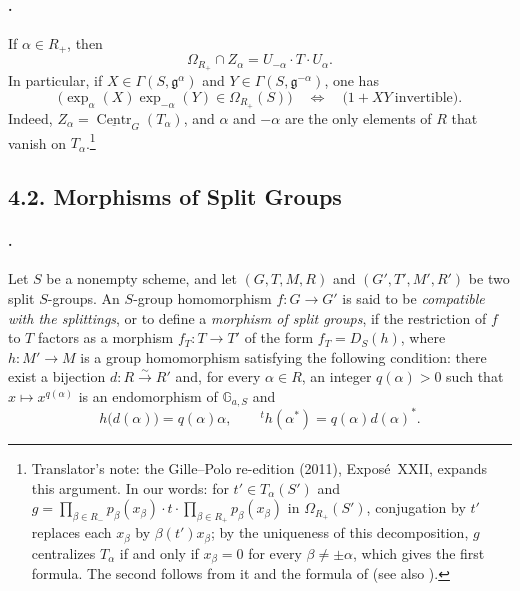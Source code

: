 \paragraph{.}
If \(\alpha\in R_+\), then
\[
  \Omega_{R_+}\cap Z_\alpha
  =
  U_{-\alpha}\mathbin{\cdot}T\mathbin{\cdot}U_\alpha.
\]
In particular, if \(X\in\Gamma(S,\mathfrak g^\alpha)\) and
\(Y\in\Gamma(S,\mathfrak g^{-\alpha})\), one has
\[
  \bigl(\exp_\alpha(X)\exp_{-\alpha}(Y)\in\Omega_{R_+}(S)\bigr)
  \quad\Longleftrightarrow\quad
  \bigl(1+XY\ \text{invertible}\bigr).
\]
Indeed, \(Z_\alpha=\underline{\operatorname{Centr}}_G(T_\alpha)\), and
\(\alpha\) and \(-\alpha\) are the only elements of \(R\) that vanish
on \(T_\alpha\).\footnote{Translator's note: the Gille--Polo re-edition (2011), Exposé~XXII, expands
this argument. In our words: for \(t'\in T_\alpha(S')\) and
\(g=\prod_{\beta\in R_-}p_\beta(x_\beta)\cdot t\cdot\prod_{\beta\in R_+}p_\beta(x_\beta)\)
in \(\Omega_{R_+}(S')\), conjugation by \(t'\) replaces each \(x_\beta\) by
\(\beta(t')x_\beta\); by the uniqueness of this decomposition, \(g\)
centralizes \(T_\alpha\) if and only if \(x_\beta=0\) for every
\(\beta\ne\pm\alpha\), which gives the first formula. The second follows from
it and the formula of  (see also ).}

\subsection*{4.2. Morphisms of Split Groups}

\paragraph{.}
Let \(S\) be a nonempty scheme, and let
\((G,T,M,R)\) and \((G',T',M',R')\) be two split \(S\)-groups.
An \(S\)-group homomorphism \(f:G\to G'\) is said to be
\emph{compatible with the splittings}, or to define a
\emph{morphism of split groups}, if the restriction of \(f\) to
\(T\) factors as a morphism \(f_T:T\to T'\) of the form
\(f_T=D_S(h)\), where \(h:M'\to M\) is a group homomorphism
satisfying the following condition: there exist a bijection
\(d:R\xrightarrow{\sim}R'\) and, for
every \(\alpha\in R\), an integer \(q(\alpha)>0\) such that
\(x\mapsto x^{q(\alpha)}\) is an endomorphism of
\(\mathbb G_{a,S}\) and
\[
  h\bigl(d(\alpha)\bigr)=q(\alpha)\alpha,
  \qquad
  {}^t h(\alpha^*)=q(\alpha)d(\alpha)^*.
\]

